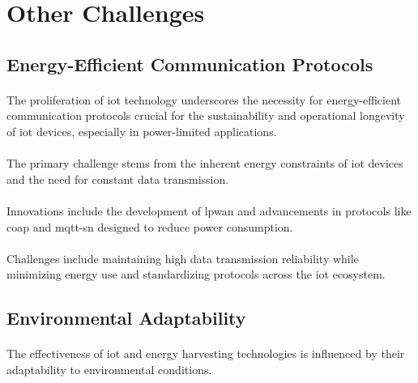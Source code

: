 \section{Other Challenges}

    \subsection{Energy-Efficient Communication Protocols}
    
        \paragraph{}
        The proliferation of \gls{iot} technology underscores the necessity for energy-efficient communication protocols crucial for the sustainability and operational longevity of \gls{iot} devices, especially in power-limited applications\cite{iotSustainableEnergySystems}.
        
        \paragraph{}
        The primary challenge stems from the inherent energy constraints of \gls{iot} devices and the need for constant data transmission.
        
        \paragraph{}
        Innovations include the development of \gls{lpwan} and advancements in protocols like \gls{coap} and \gls{mqtt-sn} designed to reduce power consumption\cite{SABOVIC2023100736}.
        
        \paragraph{}
        Challenges include maintaining high data transmission reliability while minimizing energy use and standardizing protocols across the \gls{iot} ecosystem.

    \subsection{Environmental Adaptability}
    
        \paragraph{}
        The effectiveness of \gls{iot} and energy harvesting technologies is influenced by their adaptability to environmental conditions\cite{iotSustainableEnergySystems}.
        
